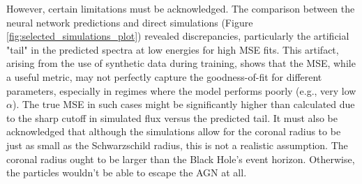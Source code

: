 However, certain limitations must be acknowledged. The comparison between the neural network predictions and direct simulations (Figure \ref{fig:selected_simulations_plot}) revealed discrepancies, particularly the artificial "tail" in the predicted spectra at low energies for high MSE fits. This artifact, arising from the use of synthetic data during training, shows that the MSE, while a useful metric, may not perfectly capture the goodness-of-fit for different parameters, especially in regimes where the model performs poorly (e.g., very low $\alpha$). The true MSE in such cases might be significantly higher than calculated due to the sharp cutoff in simulated flux versus the predicted tail. It must also be acknowledged that although the simulations allow for the coronal radius to be just as small as the Schwarzschild radius, this is not a realistic assumption. The coronal radius ought to be larger than the Black Hole's event horizon. Otherwise, the particles wouldn't be able to escape the AGN at all.






